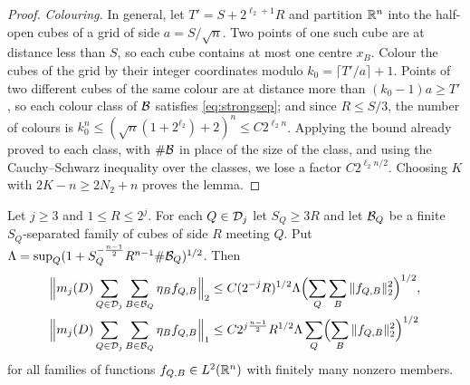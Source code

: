 \begin{proof}
\emph{Colouring.} In general, let $T'=S+2^{\ell_2+1}R$ and partition $\mathbb{R}^n$ into the half-open cubes of a grid
of side $a=S/\sqrt n$. Two points of one such cube are at distance less than $S$, so each cube contains at
most one centre $x_B$. Colour the cubes of the grid by their integer coordinates modulo
$k_0=\lceil T'/a\rceil+1$. Points of two different cubes of the same colour are at distance more than
$(k_0-1)a\ge T'$, so each colour class of $\mathcal B$ satisfies \eqref{eq:strongsep}; and since $R\le S/3$, the number
of colours is $k_0^n\le(\sqrt n(1+2^{\ell_2})+2)^n\le C2^{\ell_2n}$. Applying the bound already proved to each
class, with $\#\mathcal B$ in place of the size of the class, and using the Cauchy--Schwarz inequality over the
classes, we lose a factor $C2^{\ell_2n/2}$. Choosing $K$ with $2K-n\ge2N_2+n$ proves the lemma.
\end{proof}

\begin{proposition}\label{prop:sep}
Let $j\ge3$ and $1\le R\le2^j$. For each $Q\in\mathcal D_j$ let $S_Q\ge3R$ and let $\mathcal B_Q$ be a finite $S_Q$-separated
family of cubes of side $R$ meeting $Q$. Put $\Lambda=\sup_Q(1+S_Q^{-\frac{n-1}2}R^{n-1}\#\mathcal B_Q)^{1/2}$. Then
\begin{align}
\Bigl\|m_j(D)\sum_{Q\in\mathcal D_j}\sum_{B\in\mathcal B_Q}\eta_Bf_{Q,B}\Bigr\|_2
&\le C(2^{-j}R)^{1/2}\Lambda\Bigl(\sum_Q\sum_B\|f_{Q,B}\|_2^2\Bigr)^{1/2},\label{eq:sepL2}\\
\Bigl\|m_j(D)\sum_{Q\in\mathcal D_j}\sum_{B\in\mathcal B_Q}\eta_Bf_{Q,B}\Bigr\|_1
&\le C2^{j\frac{n-1}2}R^{1/2}\Lambda\sum_Q\Bigl(\sum_B\|f_{Q,B}\|_2^2\Bigr)^{1/2}\label{eq:sepL1}
\end{align}
for all families of functions $f_{Q,B}\in L^2(\mathbb{R}^n)$ with finitely many nonzero members.
\end{proposition}

